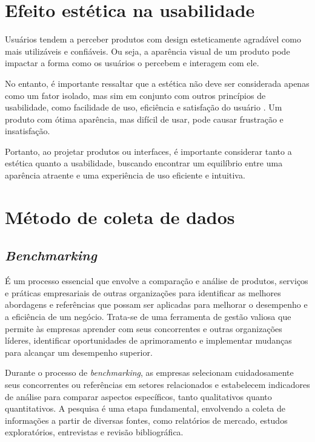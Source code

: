 \section{Efeito estética na usabilidade}

Usuários tendem a perceber produtos com design esteticamente agradável como mais utilizáveis e confiáveis. Ou seja, a aparência visual de um produto pode impactar a forma como os usuários o percebem e interagem com ele. \cite{norman2008design}

No entanto, é importante ressaltar que a estética não deve ser considerada apenas como um fator isolado, mas sim em conjunto com outros princípios de usabilidade, como facilidade de uso, eficiência e satisfação do usuário \cite{kurosu1995apparent} . Um produto com ótima aparência, mas difícil de usar, pode causar frustração e insatisfação.

Portanto, ao projetar produtos ou interfaces, é importante considerar tanto a estética quanto a usabilidade, buscando encontrar um equilíbrio entre uma aparência atraente e uma experiência de uso eficiente e intuitiva.

\section{Método de coleta de dados}

\subsection{\textbf{\textit{Benchmarking}}}

É um processo essencial que envolve a comparação e análise de produtos, serviços e práticas empresariais de outras organizações para identificar as melhores abordagens e referências que possam ser aplicadas para melhorar o desempenho e a eficiência de um negócio. Trata-se de uma ferramenta de gestão valiosa que permite às empresas aprender com seus concorrentes e outras organizações líderes, identificar oportunidades de aprimoramento e implementar mudanças para alcançar um desempenho superior.

Durante o processo de \textit{benchmarking}, as empresas selecionam cuidadosamente seus concorrentes ou referências em setores relacionados e estabelecem indicadores de análise para comparar aspectos específicos, tanto qualitativos quanto quantitativos. A pesquisa é uma etapa fundamental, envolvendo a coleta de informações a partir de diversas fontes, como relatórios de mercado, estudos exploratórios, entrevistas e revisão bibliográfica.

